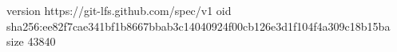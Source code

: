 version https://git-lfs.github.com/spec/v1
oid sha256:ee82f7cae341bf1b8667bbab3c14040924f00cb126e3d1f104f4a309c18b15ba
size 43840
